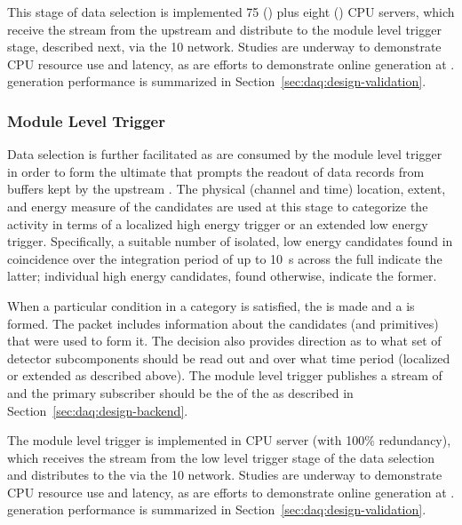 This stage of data selection is implemented \num{75} () plus eight
() CPU servers, which receive the  stream from the upstream  and distribute  to the module level trigger
stage, described next, via the \SI{10}{\Gbps}  network. Studies are underway to demonstrate CPU
resource use and latency, as are efforts to demonstrate online  generation
at .  generation performance is summarized in
Section~\ref{sec:daq:design-validation}. 


\subsubsection{Module Level Trigger}
\label{sec:daq:mlt}

Data selection is further facilitated as  are consumed
by the module level trigger in order to form the ultimate  that prompts the readout of data records from buffers kept by the upstream . 
The physical (channel and time) location, extent, and energy measure of the
candidates are used at this stage to categorize the activity in terms
of a localized high energy trigger or an extended low energy trigger. 
Specifically, a suitable number of isolated, low energy candidates found in coincidence
over the integration period of up to \SI{10}{\second} across the full 
indicate the latter; individual high energy candidates, found
otherwise, indicate the former.

When a particular condition in a category is satisfied, the  is made and a  is formed. 
The  packet includes information about the candidates (and primitives)
that were used to form it. 
The decision also provides direction as to what set of detector subcomponents
should be read out and over what time period (localized or extended as described above). 
The module level trigger publishes a stream of  and the primary subscriber should be the  of the  as described in Section~\ref{sec:daq:design-backend}.

The module level trigger is implemented in  CPU server (with 100\%
redundancy), which
receives the  stream from the low level trigger stage
of the data selection and distributes  to the
 via the \SI{10}{\Gbps}  network. Studies are
underway to demonstrate CPU resource use and latency, as are
efforts to demonstrate online  generation at .
 generation performance is summarized in
Section~\ref{sec:daq:design-validation}.

